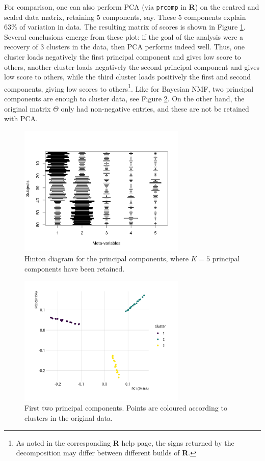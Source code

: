 \documentclass[]{article}
\begin{document}
For comparison, one can also perform PCA (via \texttt{prcomp} in {\bf R}) on the centred and scaled data matrix, retaining $5$ components, say. These 5 components explain $63\%$ of variation in data. The resulting matrix of scores is shown in Figure \ref{fig:pca_theta}. Several conclusions emerge from these plot: if the goal of the analysis were a recovery of 3 clusters in the data, then PCA performs indeed well. Thus, one cluster loads negatively the first principal component and gives low score to others, another cluster loads negatively the second principal component and gives low score to others, while the third cluster loads positively the first and second components, giving low scores to others\footnote{As noted in the corresponding {\bf R} help page, the signs returned by the decomposition may differ between different builds of {\bf R}.}. Like for Bayesian NMF, two principal components are enough to cluster data, see Figure \ref{fig:pca_2pc}. On the other hand, the original matrix $\Theta$ only had non-negative entries, and these are not be retained with PCA.

\begin{figure}
	\centering
	\includegraphics[width=8cm]{pca_theta.png}
	\caption{Hinton diagram for the principal components, where $K=5$ principal components have been retained.}
	\label{fig:pca_theta}
\end{figure}

\begin{figure}
	\centering
	\includegraphics[width=8cm]{pca_2pc.png}
	\caption{First two principal components. Points are coloured according to clusters in the original data.}
	\label{fig:pca_2pc}
\end{figure}
\end{document}
